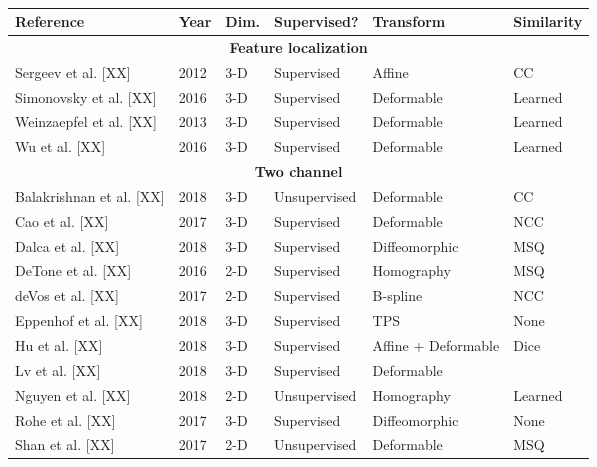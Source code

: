 

\begin{table}[!htb]
\centering
\caption{}
\label{table:methods}
\begin{tabular*}{\textwidth}{l@{\extracolsep{\fill}}l@{\extracolsep{\fill}}l@{\extracolsep{\fill}}l@{\extracolsep{\fill}}l@{\extracolsep{\fill}}l}
\toprule
\textbf{Reference} & \textbf{Year} & \textbf{Dim.} & \textbf{Supervised?} & \textbf{Transform} & \textbf{Similarity} \\
\midrule
\midrule
\multicolumn{6}{c}{\textbf{Feature localization}}
  \vspace{0.25cm} \\
  Sergeev et al. [XX] & 2012 & 3-D & Supervised & Affine & CC \\
  Simonovsky et al. [XX] & 2016 & 3-D & Supervised & Deformable & Learned \\
  Weinzaepfel et al. [XX] & 2013 & 3-D & Supervised & Deformable & Learned \\
  Wu et al. [XX] & 2016 & 3-D & Supervised & Deformable & Learned \\
\midrule
\multicolumn{6}{c}{\textbf{Two channel}}
  \vspace{0.25cm} \\
  Balakrishnan et al. [XX] & 2018 & 3-D & Unsupervised & Deformable & CC \\
  Cao et al. [XX] & 2017 & 3-D & Supervised & Deformable & NCC \\
  Dalca et al. [XX] & 2018 & 3-D & Supervised & Diffeomorphic & MSQ \\
  DeTone et al. [XX] & 2016 & 2-D & Supervised & Homography & MSQ \\
  deVos et al. [XX] & 2017 & 2-D & Supervised & B-spline & NCC \\
  Eppenhof et al. [XX] & 2018 & 3-D & Supervised & TPS & None \\       %
  Hu et al. [XX] & 2018 & 3-D & Supervised & Affine + Deformable & Dice \\
  Lv et al. [XX] & 2018 & 3-D & Supervised & Deformable & {} \\
  Nguyen et al. [XX] & 2018 & 2-D & Unsupervised & Homography & Learned \\
  Rohe et al. [XX] & 2017 & 3-D & Supervised & Diffeomorphic & None \\  %
  Shan et al. [XX] & 2017 & 2-D & Unsupervised & Deformable & MSQ \\

\end{tabular*}
\end{table}
